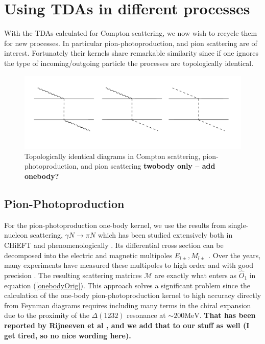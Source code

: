 \documentclass[a4paper,11pt]{article}
\newcommand{\com}[1]{\color{blue}\small\textbf{ #1 }\color{black}\normalsize}
\newcommand{\MeV}{\mathrm{MeV}}
\begin{document}
\section{Using TDAs in different processes}
With the TDAs calculated for Compton scattering, we now wish to recycle them for new processes.
In particular pion-photoproduction, and
pion scattering are of interest.
Fortunately their kernels share remarkable similarity since if one ignores the type of incoming/outgoing 
particle the processes are topologically identical.
\begin{figure}[H]
\centering
\includegraphics[scale=0.5]{KernelSim.pdf}
\caption{Topologically identical diagrams in Compton scattering, pion-photoproduction, and pion scattering \com{twobody only -- add onebody?}}
\end{figure}
\subsection{Pion-Photoproduction}
For the pion-photoproduction one-body kernel, we use the results from
single-nucleon scattering, $\gamma N \to \pi N$ which has
been studied extensively both in CHiEFT and phenomenologically \cite{pionphoto,
Rijneveen2021,Workman2012,Briscoe2023}.
Its differential cross section can be decomposed into the
electric and magnetic multipoles $E_{l\pm}, M_{l\pm}$ \cite{pionphoto}.
Over the years, many experiments have measured
these multipoles to high order and with good precision
\cite{multipolePionPion}.
The resulting scattering matrices $\mathcal{M}$ are exactly what
enters as $\hat{O}_1$ in equation (\ref{onebodyOrig}).
This approach solves a significant problem since the calculation of
the one-body pion-photoproduction kernel
to high accuracy directly from Feynman diagrams requires including many terms
in the chiral expansion due to the proximity of the $\Delta(1232)$ resonance at $\sim 200\MeV$. \com{That has been reported by Rijneeven et al \cite{Rijneveen2021}, and we add that to our stuff as well (I get tired, so no nice wording here).}
\end{document}
